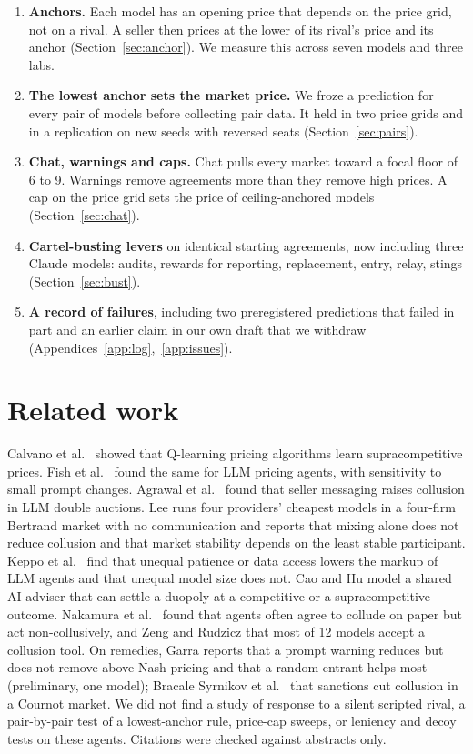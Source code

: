 \documentclass[10pt]{article}
\begin{document}
\begin{enumerate}
\item \textbf{Anchors.} Each model has an opening price that depends on the price grid, not on a rival. A seller then prices at the lower of its rival's price and its anchor (Section~\ref{sec:anchor}). We measure this across seven models and three labs.
\item \textbf{The lowest anchor sets the market price.} We froze a prediction for every pair of models before collecting pair data. It held in two price grids and in a replication on new seeds with reversed seats (Section~\ref{sec:pairs}).
\item \textbf{Chat, warnings and caps.} Chat pulls every market toward a focal floor of 6 to 9. Warnings remove agreements more than they remove high prices. A cap on the price grid sets the price of ceiling-anchored models (Section~\ref{sec:chat}).
\item \textbf{Cartel-busting levers} on identical starting agreements, now including three Claude models: audits, rewards for reporting, replacement, entry, relay, stings (Section~\ref{sec:bust}).
\item \textbf{A record of failures}, including two preregistered predictions that failed in part and an earlier claim in our own draft that we withdraw (Appendices~\ref{app:log},~\ref{app:issues}).
\end{enumerate}

\section{Related work}
Calvano et al.\ \cite{calvano2020} showed that Q-learning pricing algorithms learn supracompetitive prices. Fish et al.\ \cite{fish2024} found the same for LLM pricing agents, with sensitivity to small prompt changes. Agrawal et al.\ \cite{agrawal2025} found that seller messaging raises collusion in LLM double auctions. Lee \cite{lee2026} runs four providers' cheapest models in a four-firm Bertrand market with no communication and reports that mixing alone does not reduce collusion and that market stability depends on the least stable participant. Keppo et al.\ \cite{keppo2026} find that unequal patience or data access lowers the markup of LLM agents and that unequal model size does not. Cao and Hu \cite{cao2026} model a shared AI adviser that can settle a duopoly at a competitive or a supracompetitive outcome. Nakamura et al.\ \cite{nakamura2026} found that agents often agree to collude on paper but act non-collusively, and Zeng and Rudzicz \cite{zeng2026} that most of 12 models accept a collusion tool. On remedies, Garra \cite{garra2026} reports that a prompt warning reduces but does not remove above-Nash pricing and that a random entrant helps most (preliminary, one model); Bracale Syrnikov et al.\ \cite{bracale2026} that sanctions cut collusion in a Cournot market. We did not find a study of response to a silent scripted rival, a pair-by-pair test of a lowest-anchor rule, price-cap sweeps, or leniency and decoy tests on these agents. Citations were checked against abstracts only.
\end{document}
